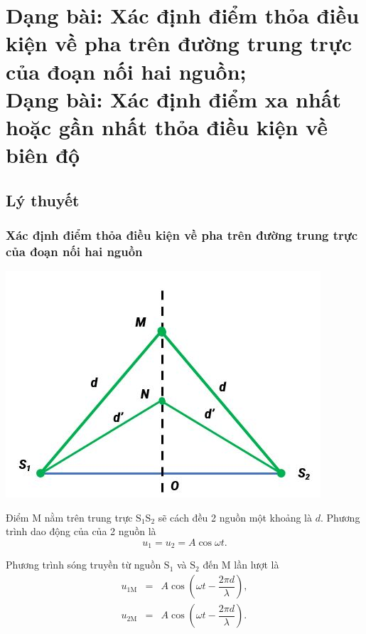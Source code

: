 
\chapter[Dạng bài: Xác định điểm thỏa điều kiện về pha trên đường trung trực của đoạn nối hai nguồn;\\
Dạng bài: Xác định điểm xa nhất hoặc gần nhất thỏa điều kiện về biên độ]{Dạng bài: Xác định điểm thỏa điều kiện về pha trên đường trung trực của đoạn nối hai nguồn;\\Dạng bài: Xác định điểm xa nhất hoặc gần nhất thỏa điều kiện về biên độ}
\section{Lý thuyết}
\subsection{Xác định điểm thỏa điều kiện về pha trên đường trung trực của đoạn nối hai nguồn}
\begin{center}
	\includegraphics[scale=0.7]{../figs/VN12-PH-11-A-007-3-V2-1.JPG}
\end{center}

Điểm M nằm trên trung trực $\text{S}_1 \text{S}_2$ sẽ cách đều 2 nguồn một khoảng là $d$. Phương trình dao động của của 2 nguồn là
\begin{equation*}
	u_1=u_2=A \cos \omega  t.
\end{equation*}

Phương trình sóng truyền từ nguồn $\text{S}_1$ và $\text{S}_2$ đến M lần lượt là
\begin{eqnarray*}
	u_{\text{1M}}&=&A \cos \left(\omega  t - \dfrac{2\pi d}{\lambda} \right),\\
	u_{\text{2M}}&=&A \cos \left(\omega  t - \dfrac{2\pi d}{\lambda} \right).
\end{eqnarray*}

